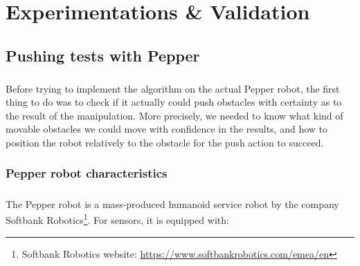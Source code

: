 
\chapter{Experimentations \& Validation} %

\label{Chapter5} %

\section{Pushing tests with Pepper}

\paragraph{} Before trying to implement the algorithm on the actual Pepper robot, the first thing to do was to check if it actually could push obstacles with certainty as to the result of the manipulation. More precisely, we needed to know what kind of movable obstacles we could move with confidence in the results, and how to position the robot relatively to the obstacle for the push action to succeed.

\subsection{Pepper robot characteristics}

\paragraph{} The Pepper robot is a mass-produced humanoid service robot by the company Softbank Robotics\footnote{Softbank Robotics website: \url{https://www.softbankrobotics.com/emea/en}}. For sensors, it is equipped with:

